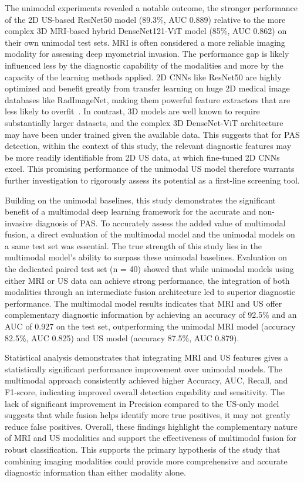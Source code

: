 \documentclass[12pt]{article}
\begin{document}
The unimodal experiments revealed a notable outcome, the stronger performance of the 2D US-based ResNet50 model (89.3\%, AUC 0.889) relative to the more complex 3D MRI-based hybrid DenseNet121-ViT model (85\%, AUC 0.862) on their own unimodal test sets. MRI is often considered a more reliable imaging modality for assessing deep myometrial invasion. The performance gap is likely influenced less by the diagnostic capability of the modalities and more by the capacity of the learning methods applied. 2D CNNs like ResNet50 are highly optimized and benefit greatly from transfer learning on huge 2D medical image databases like RadImageNet, making them powerful feature extractors that are less likely to overfit~\cite{Mei_2022}. In contrast, 3D models are well known to require substantially larger datasets, and the complex 3D DenseNet-ViT architecture may have been under trained given the available data. This suggests that for PAS detection, within the context of this study, the relevant diagnostic features may be more readily identifiable from 2D US data, at which fine-tuned 2D CNNs excel. This promising performance of the unimodal US model therefore warrants further investigation to rigorously assess its potential as a first-line screening tool. 

Building on the unimodal baselines, this study demonstrates the significant benefit of a multimodal deep learning framework for the accurate and non-invasive diagnosis of PAS. To accurately assess the added value of multimodal fusion, a direct evaluation of the multimodal model and the unimodal models on a same test set was essential. The true strength of this study lies in the multimodal model's ability to surpass these unimodal baselines. Evaluation on the dedicated paired test set (n = 40) showed that while unimodal models using either MRI or US data can achieve strong performance, the integration of both modalities through an intermediate fusion architecture led to superior diagnostic performance. The multimodal model results indicates that MRI and US offer complementary diagnostic information by achieving an accuracy of 92.5\% and an AUC of 0.927 on the test set, outperforming the unimodal MRI model (accuracy 82.5\%, AUC 0.825) and US model (accuracy 87.5\%, AUC 0.879).

Statistical analysis demonstrates that integrating MRI and US features gives a statistically significant performance improvement over unimodal models. The multimodal approach consistently achieved higher Accuracy, AUC, Recall, and F1-score, indicating improved overall detection capability and sensitivity. The lack of significant improvement in Precision compared to the US-only model suggests that while fusion helps identify more true positives, it may not greatly reduce false positives. Overall, these findings highlight the complementary nature of MRI and US modalities and support the effectiveness of multimodal fusion for robust classification. This supports the primary hypothesis of the study that combining imaging modalities could provide more comprehensive and accurate diagnostic information than either modality alone.
\end{document}

